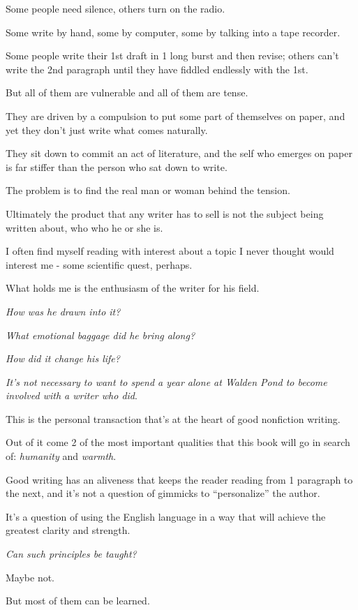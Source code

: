 \documentclass{book}
\numberwithin{equation}{section}
\begin{document}
Some people need silence, others turn on the radio.

Some write by hand, some by computer, some by talking into a tape recorder.

Some people write their 1st draft in 1 long burst and then revise; others can't write the 2nd paragraph until they have fiddled endlessly with the 1st.

%
But all of them are vulnerable and all of them are tense.

They are driven by a compulsion to put some part of themselves on paper, and yet they don't just write what comes naturally.

They sit down to commit an act of literature, and the self who emerges on paper is far stiffer than the person who sat down to write.

The problem is to find the real man or woman behind the tension.

Ultimately the product that any writer has to sell is not the subject being written about, who who he or she is.

I often find myself reading with interest about a topic I never thought would interest me - some scientific quest, perhaps.

What holds me is the enthusiasm of the writer for his field.

\textit{How was he drawn into it?}

\textit{What emotional baggage did he bring along?}

\textit{How did it change his life?}

\textit{It's not necessary to want to spend a year alone at Walden Pond to become involved with a writer who did}.

%
This is the personal transaction that's at the heart of good nonfiction writing.

Out of it come 2 of the most important qualities that this book will go in search of: \textit{humanity} and \textit{warmth}.

Good writing has an aliveness that keeps the reader reading from 1 paragraph to the next, and it's not a question of gimmicks to ``personalize'' the author.

It's a question of using the English language in a way that will achieve the greatest clarity and strength.

%
\textit{Can such principles be taught?}

Maybe not.

But most of them can be learned.
\end{document}
